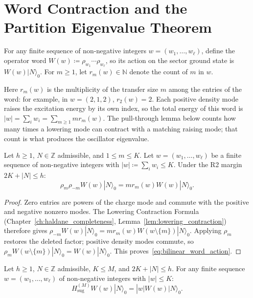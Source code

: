 \section{Word Contraction and the Partition Eigenvalue Theorem}

For any finite sequence of non-negative integers $w=(w_1,\dots,w_\ell)$, define the operator word $W(w)\coloneqq\rho_{w_1}\cdots\rho_{w_\ell}$, so its action on the sector ground state is $W(w)|N\rangle_0$. For $m \ge 1$, let $r_m(w) \in \mathbb{N}$ denote the count of $m$ in $w$.

Here $r_m(w)$ is the multiplicity of the transfer size $m$ among the entries of the word: for example, in $w=(2,1,2)$, $r_2(w)=2$. Each positive density mode raises the excitation energy by its own index, so the total energy of this word is $|w|=\sum_i w_i=\sum_{m\ge1}m r_m(w)$. The pull-through lemma below counts how many times a lowering mode can contract with a matching raising mode; that count is what produces the oscillator eigenvalue.

\begin{lemma}
\label{lem:density_bilinear_word}
Let $h \ge 1$, $N \in \mathbb{Z}$ admissible, and $1 \le m \le K$. Let $w=(w_1,\dots,w_\ell)$ be a finite sequence of non-negative integers with $|w| \coloneqq \sum_i w_i \le K$. Under the R2 margin $2K + |N| \le h$:
\begin{equation}
\label{eq:bilinear_word_action}
\rho_m \rho_{-m} W(w)|N\rangle_0 = m r_m(w) W(w)|N\rangle_0.
\end{equation}
\end{lemma}

\begin{proof}
Zero entries are powers of the charge mode and commute with the positive and negative nonzero modes. The Lowering Contraction Formula (Chapter~\ref{ch:haldane_completeness}, Lemma~\ref{lem:lowering_contraction}) therefore gives
$\rho_{-m}W(w)|N\rangle_0=m r_m(w)W(w\setminus\{m\})|N\rangle_0$.
Applying $\rho_m$ restores the deleted factor; positive density modes
commute, so $\rho_mW(w\setminus\{m\})|N\rangle_0=W(w)|N\rangle_0$.
This proves~\eqref{eq:bilinear_word_action}.
\end{proof}

\begin{proposition}
\label{prop:sugawara_word_eigenvalue}
Let $h \ge 1$, $N \in \mathbb{Z}$ admissible, $K \le M$, and $2K + |N| \le h$. For any finite sequence $w=(w_1,\dots,w_\ell)$ of non-negative integers with $|w| \le K$:
\begin{equation}
H_{\mathrm{sug}}^{(M)} W(w)|N\rangle_0 = |w|W(w)|N\rangle_0.
\end{equation}
\end{proposition}

